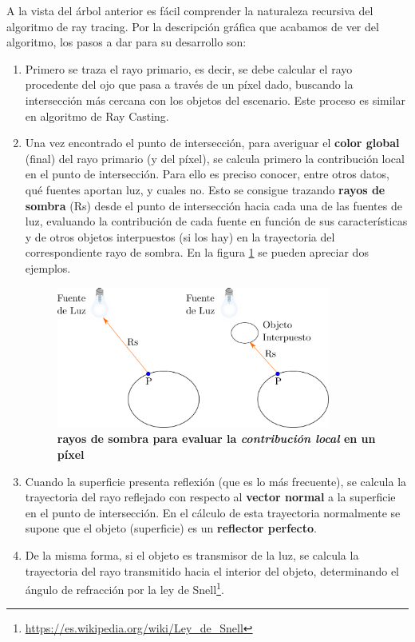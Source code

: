 A la vista del árbol anterior es fácil comprender la naturaleza recursiva del algoritmo de ray tracing. Por la descripción gráfica que acabamos de ver del algoritmo, los pasos a dar para su desarrollo son:
\begin{enumerate}
    \item Primero se traza el rayo primario, es decir, se debe calcular el rayo procedente del ojo que pasa a través de un píxel dado, buscando la intersección más cercana con los objetos del escenario. Este proceso es similar en algoritmo de Ray Casting.
\item Una vez encontrado el punto de intersección, para averiguar el \textbf{color global} (final) del rayo primario (y del píxel), se calcula primero la contribución local en el punto de intersección. Para ello es preciso conocer, entre otros datos, qué fuentes aportan luz, y cuales no. Esto se consigue trazando \textbf{rayos de sombra} (Rs) desde el punto de intersección hacia cada una de las fuentes de luz, evaluando la contribución de cada fuente en función de sus características y de otros objetos interpuestos (si los hay) en la trayectoria del correspondiente rayo de sombra. En la figura \ref{fig:grafica12a} se pueden apreciar dos ejemplos.
\begin{figure}[h]
    \includegraphics[width=9cm]{Img/CPD/grafica12a.png}
    \centering
    \caption{\textbf{\footnotesize{  rayos de sombra para evaluar la \textit{contribución local} en un píxel   }}}
    \label{fig:grafica12a}
\end{figure}
\item Cuando la superficie presenta reflexión (que es lo más frecuente), se calcula la trayectoria del rayo reflejado con respecto al \textbf{vector normal} a la superficie en el punto de intersección. En el cálculo de esta trayectoria normalmente se supone que el objeto (superficie) es un \textbf{reflector perfecto}.

\item De la misma forma, si el objeto es transmisor de la luz, se calcula la trayectoria del rayo transmitido hacia el interior del objeto, determinando el ángulo de refracción por la ley de Snell\footnote{\url{https://es.wikipedia.org/wiki/Ley_de_Snell}}.
\end{enumerate}

